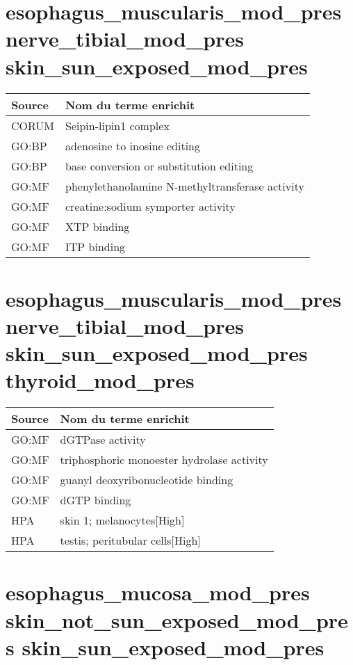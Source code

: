 \section*{esophagus\_muscularis\_mod\_pres \newline nerve\_tibial\_mod\_pres \newline skin\_sun\_exposed\_mod\_pres}

\begin{longtable}{ll}
\toprule
Source & Nom du terme enrichit\\
\midrule
CORUM & Seipin-lipin1 complex\\
GO:BP & adenosine to inosine editing\\
GO:BP & base conversion or substitution editing\\
GO:MF & phenylethanolamine N-methyltransferase activity\\
GO:MF & creatine:sodium symporter activity\\
GO:MF & XTP binding\\
GO:MF & ITP binding\\
\bottomrule
\end{longtable}

\section*{esophagus\_muscularis\_mod\_pres \newline nerve\_tibial\_mod\_pres \newline skin\_sun\_exposed\_mod\_pres \newline thyroid\_mod\_pres}

\begin{longtable}{ll}
\toprule
Source & Nom du terme enrichit\\
\midrule
GO:MF & dGTPase activity\\
GO:MF & triphosphoric monoester hydrolase activity\\
GO:MF & guanyl deoxyribonucleotide binding\\
GO:MF & dGTP binding\\
HPA & skin 1; melanocytes[High]\\
HPA & testis; peritubular cells[High]\\
\bottomrule
\end{longtable}

\section*{esophagus\_mucosa\_mod\_pres \newline skin\_not\_sun\_exposed\_mod\_pres \newline skin\_sun\_exposed\_mod\_pres}

